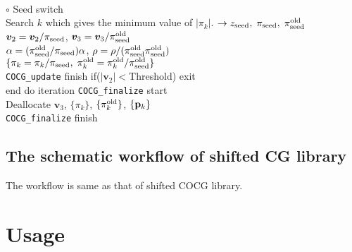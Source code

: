 \documentclass[12pt,titlepage]{article}
\renewenvironment{leftbar}{%
  \def\FrameCommand{\vrule width 1pt \hspace{0pt}}%
  \MakeFramed {\advance\hsize-\width \FrameRestore}}%
 {\endMakeFramed}
\begin{document}
\begin{leftbar}
  \\\hspace{1.0cm}
  $\circ$ Seed switch
  \\\hspace{1.0cm}
  Search $k$ which gives the minimum value of $|\pi_k|$.
  $\rightarrow z_{\rm seed},\; \pi_{\rm seed},\; \pi_{\rm seed}^{\rm old} $
  \\\hspace{1.0cm}
  ${\boldsymbol v}_2 = {\boldsymbol v}_2 / \pi_{\rm seed}$,
  ${\boldsymbol v}_3 = {\boldsymbol v}_3 / \pi_{\rm seed}^{\rm old}$
  \\\hspace{1.0cm}
  $\alpha = (\pi_{\rm seed}^{\rm old} / \pi_{\rm seed}) \alpha$,
  $\rho = \rho / (\pi_{\rm seed}^{\rm old} \pi_{\rm seed}^{\rm old})$
  \\\hspace{1.0cm}
  $\{\pi_k = \pi_k / \pi_{\rm seed},\; \pi_k^{\rm old} = \pi_k^{\rm old} / \pi_{\rm seed}^{\rm old}\}$
  \\\hspace{0.5cm}
  \verb|COCG_update| finish
\end{leftbar}
\vspace{-1em}
\noindent
\hspace{0.5cm}
if($|{\boldsymbol v}_2| < $Threshold) exit
\\
end do iteration
\vspace{-1em}
\begin{leftbar}
  \noindent
  \verb|COCG_finalize| start
  \\ \hspace{0.5cm}
  Deallocate ${\boldsymbol v}_3$, $\{\pi_k\}$, $\{\pi_k^{\rm old}\}$, $\{{\bf p}_k\}$
  \\
  \verb|COCG_finalize| finish
\end{leftbar}
\vspace{-1em}

\subsection{The schematic workflow of shifted CG library}

The workflow is same as that of shifted COCG library.

\section{Usage}
\end{document}
